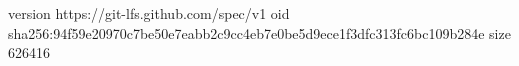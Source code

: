 version https://git-lfs.github.com/spec/v1
oid sha256:94f59e20970c7be50e7eabb2c9cc4eb7e0be5d9ece1f3dfc313fc6bc109b284e
size 626416
